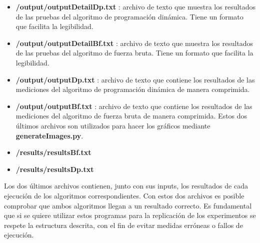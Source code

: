 \begin{itemize}
    \item \textbf{/output/outputDetailDp.txt} : archivo de texto que muestra los resultados de las pruebas del algoritmo de programación dinámica. Tiene un formato que facilita la 
    legibilidad. 
    \item \textbf{/output/outputDetailBf.txt} : archivo de texto que muestra los resultados de las pruebas del algoritmo de fuerza bruta. Tiene un formato que facilita la
    legibilidad.
    \item \textbf{/output/outputDp.txt} : archivo de texto que contiene los resultados de las mediciones del algoritmo de programación dinámica de manera comprimida.
    \item \textbf{/output/outputBf.txt} : archivo de texto que contiene los resultados de las mediciones del algoritmo de fuerza bruta de manera comprimida. 
    Estos dos últimos archivos son utilizados para hacer los gráficos mediante \textbf{generateImages.py}.
    \item \textbf{/results/resultsBf.txt}
    \item \textbf{/results/resultsDp.txt}
\end{itemize}
Los dos últimos archivos contienen, junto con sus inputs, los resultados de cada ejecución de los algoritmos correspondientes. Con estos dos archivos es posible comprobar
que ambos algoritmos llegan a un resultado correcto.
Es fundamental que si se quiere utilizar estos programas para la replicación de los experimentos se respete la estructura descrita, con el fin de evitar 
medidas erróneas o fallos de ejecución.